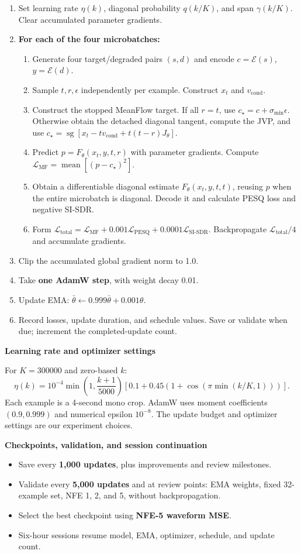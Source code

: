 \documentclass[11pt,letterpaper]{article}
\newcommand{\subheading}[1]{{\sffamily\bfseries\color{ink}#1}\par}
\newcommand{\E}{\mathcal E}\newcommand{\D}{\mathcal D}
\newcommand{\sg}{\operatorname{sg}}
\newcommand{\MF}{\mathcal L_{\mathrm{MF}}}
\newcommand{\PESQ}{\mathcal L_{\mathrm{PESQ}}}
\newcommand{\SDR}{\mathcal L_{\mathrm{SI\text{-}SDR}}}
\newcommand{\total}{\mathcal L_{\mathrm{total}}}
\begin{document}
\begin{enumerate}
\item Set learning rate $\eta(k)$, diagonal probability $q(k/K)$, and span $\gamma(k/K)$. Clear accumulated parameter gradients.
\item \textbf{For each of the four microbatches:}
\begin{enumerate}[label=\alph*.,leftmargin=1.45em,itemsep=3pt]
\item Generate four target/degraded pairs $(s,d)$ and encode $c=\E(s)$, $y=\E(d)$.
\item Sample $t,r,\epsilon$ independently per example. Construct $x_t$ and $v_{\mathrm{cond}}$.
\item Construct the stopped MeanFlow target. If all $r=t$, use $c_\star=c+\sigma_{\min}\epsilon$. Otherwise obtain the detached diagonal tangent, compute the JVP, and use $c_\star=\sg[x_t-tv_{\mathrm{cond}}+t(t-r)J_\theta]$.
\item Predict $p=F_\theta(x_t,y,t,r)$ with parameter gradients. Compute $\MF=\operatorname{mean}[(p-c_\star)^2]$.
\item Obtain a differentiable diagonal estimate $F_\theta(x_t,y,t,t)$, reusing $p$ when the entire microbatch is diagonal. Decode it and calculate PESQ loss and negative SI-SDR.
\item Form $\total=\MF+0.001\PESQ+0.0001\SDR$. Backpropagate $\total/4$ and accumulate gradients.
\end{enumerate}
\item Clip the accumulated global gradient norm to 1.0.
\item Take \textbf{one AdamW step}, with weight decay 0.01.
\item Update EMA: $\bar\theta\leftarrow0.999\bar\theta+0.001\theta$.
\item Record losses, update duration, and schedule values. Save or validate when due; increment the completed-update count.
\end{enumerate}

\subheading{Learning rate and optimizer settings}
For $K=300000$ and zero-based $k$:
\[
 \eta(k)=10^{-4}\min\!\left(1,\frac{k+1}{5000}\right)
 \left[0.1+0.45\left(1+\cos\!\left(\pi\min(k/K,1)\right)\right)\right].
\]
Each example is a 4-second mono crop. AdamW uses moment coefficients $(0.9,0.999)$ and numerical epsilon $10^{-8}$. The update budget and optimizer settings are our experiment choices.

\subheading{Checkpoints, validation, and session continuation}
\begin{itemize}
\item Save every \textbf{1,000 updates}, plus improvements and review milestones.
\item Validate every \textbf{5,000 updates} and at review points: EMA weights, fixed 32-example set, NFE 1, 2, and 5, without backpropagation.
\item Select the best checkpoint using \textbf{NFE-5 waveform MSE}.
\item Six-hour sessions resume model, EMA, optimizer, schedule, and update count.
\end{itemize}
\end{document}
